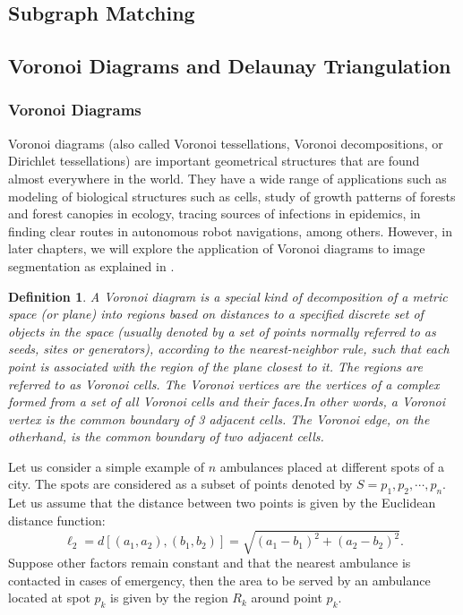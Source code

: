 \documentclass[10pt,a4paper]{article}
\newtheorem{defn}{Definition}
\begin{document}
    \subsection{Subgraph Matching}   
 
     \subsection{Voronoi Diagrams and Delaunay Triangulation} \subsubsection{Voronoi Diagrams }  
     Voronoi diagrams (also called Voronoi tessellations, Voronoi
     decompositions, or Dirichlet tessellations) are important geometrical structures that are found almost everywhere in the world. They have a wide range of applications such as modeling of biological structures such as cells, study of growth patterns of forests and forest canopies in ecology, tracing sources of infections in epidemics, in finding clear routes in autonomous robot navigations, among others. However, in later chapters, we will explore the application of Voronoi diagrams to image segmentation as explained in \citep{stoica2011delaunay}.
     \\
     \begin{defn}
     	A Voronoi diagram is a special kind of decomposition of a metric space (or plane) into regions based on distances to a specified discrete set of objects in the space (usually denoted by a
     	set of points normally referred to as seeds, sites or generators), according to the nearest-neighbor rule, such that each point is associated with the region of the plane closest to it. The regions are referred to as Voronoi cells. The Voronoi vertices are the vertices of a complex formed from a set of all Voronoi cells and their faces.In other words, a Voronoi vertex is the common boundary of 3 adjacent cells. The Voronoi edge, on the otherhand, is the common boundary of two adjacent cells.
     \end{defn}
     Let us consider a simple example of $n$ ambulances placed at different spots of a city. The spots are considered as a subset of points denoted by $S = {p_1, p_2, \cdots, p_n}$. Let us assume that the distance between two points is given by the Euclidean distance function:
      \begin{equation}
      \ell_2 = d[(a_1,a_2),(b_1,b_2)] = \sqrt{(a_1 -b_1)^2 + (a_2 -b_2)^2}.
      \end{equation} Suppose other factors remain constant and that the nearest ambulance is contacted in cases of emergency, then the area to be served by an ambulance located at spot $p_k$ is given by the region $R_k$ around point $p_k$.
      
\end{document}

